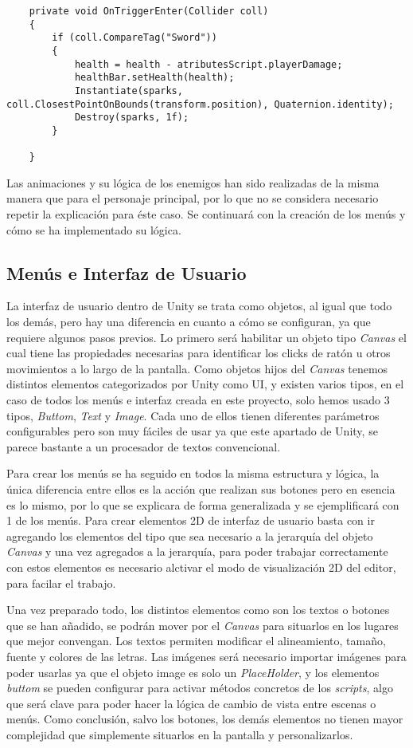\begin{lstlisting}
    private void OnTriggerEnter(Collider coll)
    {
        if (coll.CompareTag("Sword"))
        {
            health = health - atributesScript.playerDamage;
            healthBar.setHealth(health);
            Instantiate(sparks, coll.ClosestPointOnBounds(transform.position), Quaternion.identity);
            Destroy(sparks, 1f);
        }

    }
\end{lstlisting}

Las animaciones y su lógica de los enemigos han sido realizadas de la misma manera que para el personaje principal, por lo que no se considera necesario repetir la explicación para éste caso. Se continuará con la creación de los menús y cómo se ha implementado su lógica.

\subsection{Menús e Interfaz de Usuario}

La interfaz de usuario dentro de Unity se trata como objetos, al igual que todo los demás, pero hay una diferencia en cuanto a cómo se configuran, ya que requiere algunos pasos previos. Lo primero será habilitar un objeto tipo \textit{Canvas} el cual tiene las propiedades necesarias para identificar los clicks de ratón u otros movimientos a lo largo de la pantalla. Como objetos hijos del \textit{Canvas} tenemos distintos elementos categorizados por Unity como UI, y existen varios tipos, en el caso de todos los menús e interfaz creada en este proyecto, solo hemos usado 3 tipos, \textit{Buttom}, \textit{Text} y \textit{Image}. Cada uno de ellos tienen diferentes parámetros configurables pero son muy fáciles de usar ya que este apartado de Unity, se parece bastante a un procesador de textos convencional.

Para crear los menús se ha seguido en todos la misma estructura y lógica, la única diferencia entre ellos es la acción que realizan sus botones pero en esencia es lo mismo, por lo que se explicara de forma generalizada y se ejemplificará con 1 de los menús. Para crear elementos 2D de interfaz de usuario basta con ir agregando los elementos del tipo que sea necesario a la jerarquía del objeto \textit{Canvas} y una vez agregados a la jerarquía, para poder trabajar correctamente con estos elementos es necesario alctivar el modo de visualización 2D del editor, para facilar el trabajo. 

Una vez preparado todo, los distintos elementos como son los textos o botones que se han añadido, se podrán mover por el \textit{Canvas} para situarlos en los lugares que mejor convengan. Los textos permiten modificar el alineamiento, tamaño, fuente y colores de las letras. Las imágenes será necesario importar imágenes para poder usarlas ya que el objeto image es solo un \textit{PlaceHolder}, y los elementos \textit{buttom} se pueden configurar para activar métodos concretos de los \textit{scripts}, algo que será clave para poder hacer la lógica de cambio de vista entre escenas o menús. Como conclusión, salvo los botones, los demás elementos no tienen mayor complejidad que simplemente situarlos en la pantalla y personalizarlos.

